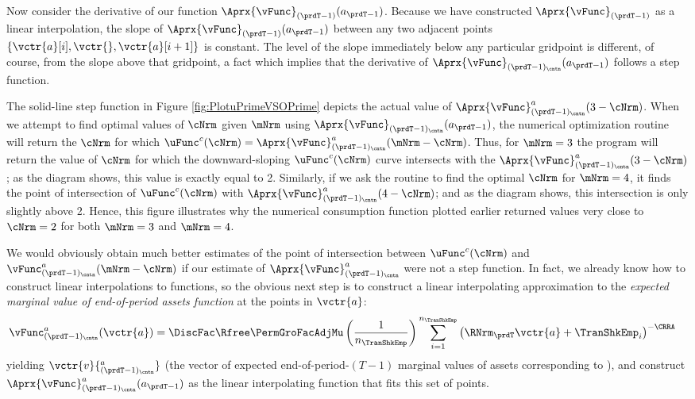 \documentclass[\econtexRoot/SolvingMicroDSOPs]{subfiles}
\begin{document}
Now consider the derivative of our function $\Aprx{\vFunc}_{(\prdT-1)}(a_{\prdT-1})$.  Because we have
constructed $\Aprx{\vFunc}_{(\prdT-1)}$ as a linear interpolation, the slope of
$\Aprx{\vFunc}_{(\prdT-1)}(a_{\prdT-1})$ between any two adjacent points
$\{\vctr{a}[i],\vctr{},\vctr{a}[{i+1}]\}$ is constant.  The level of the slope immediately below any
particular gridpoint is different, of course, from the slope above that gridpoint, a fact which
implies that the derivative of $\Aprx{\vFunc}_{(\prdT-1)_\cntn}(a_{\prdT-1})$ follows a step function.

The solid-line step function in Figure \ref{fig:PlotuPrimeVSOPrime} depicts the actual value of
$\Aprx{\vFunc}_{(\prdT-1)_\cntn}^{a}(3-\cNrm)$.  When we attempt to find optimal values of
$\cNrm$ given $\mNrm$ using $\Aprx{\vFunc}_{(\prdT-1)_\cntn}(a_{\prdT-1})$, the numerical optimization routine will
return the $\cNrm$ for which
$\uFunc^{c}(\cNrm) = \Aprx{\vFunc}^{a}_{(\prdT-1)_\cntn}(\mNrm-\cNrm)$.  Thus, for
$\mNrm=3$ the program will return the value of $\cNrm$ for which the downward-sloping
$\uFunc^{c}(\cNrm)$ curve intersects with the
$\Aprx{\vFunc}_{(\prdT-1)_\cntn}^{a}(3-\cNrm)$; as the diagram shows, this value is exactly equal to 2.
Similarly, if we ask the routine to find the optimal $\cNrm$ for $\mNrm=4$, it finds the point of
intersection of $\uFunc^{c}(\cNrm)$ with $\Aprx{\vFunc}_{(\prdT-1)_\cntn}^{a}(4-\cNrm)$; and as the diagram shows, this
intersection is only slightly above 2.  Hence, this figure illustrates why the numerical consumption
function plotted earlier returned values very close to $\cNrm=2$ for both $\mNrm=3$ and $\mNrm=4$.

We would obviously obtain much better estimates of the point of intersection between $\uFunc^{c}(\cNrm)$ and $\vFunc_{(\prdT-1)_\cntn}^{a}(\mNrm-\cNrm)$ if our estimate of $\Aprx{\vFunc}^{a}_{(\prdT-1)_\cntn}$ were not a step function.  In fact, we already know how to construct linear interpolations to functions, so the obvious next step is to construct a linear interpolating approximation to the \textit{expected marginal value of end-of-period assets function} at the points in $\vctr{a}$:
\begin{equation}\begin{gathered}\begin{aligned}
      \vFunc_{(\prdT-1)_\cntn}^{a}(\vctr{a})  & =  \DiscFac \Rfree \PermGroFacAdjMu \left(\frac{1}{n_{\TranShkEmp}}\right) \sum_{i=1}^{n_{\TranShkEmp}} \left(\RNrm_{\prdT} \vctr{a} + \TranShkEmp_{i}\right)^{-\CRRA} \label{eq:vEndPrimeTm1}
    \end{aligned}\end{gathered}\end{equation}
yielding $\vctr{v}{^{a}_{(\prdT-1)_\cntn}}$ (the vector of expected end-of-period-$(T-1)$ marginal values of assets corresponding to ),  %
and construct
$\Aprx{\vFunc}_{(\prdT-1)_\cntn}^{a}(a_{\prdT-1})$ as the linear
interpolating function that fits this set of points.
\end{document}
